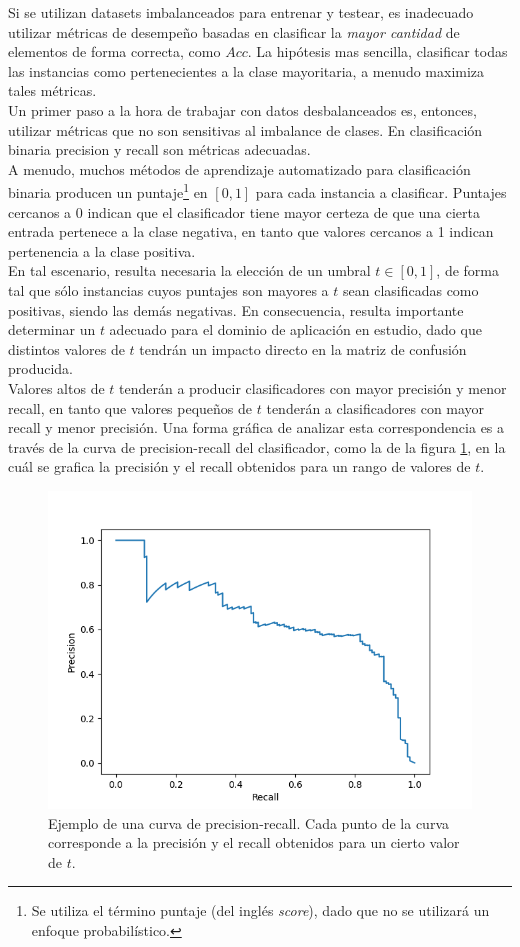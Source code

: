 Si se utilizan datasets imbalanceados para entrenar y testear, es inadecuado utilizar métricas de desempeño basadas en clasificar la \textit{mayor cantidad} de elementos de forma correcta, como $Acc$. La hipótesis mas sencilla, clasificar todas las instancias como pertenecientes a la clase mayoritaria, a menudo maximiza tales métricas. \\

Un primer paso a la hora de trabajar con datos desbalanceados es, entonces, utilizar métricas que no son sensitivas al imbalance de clases. En clasificación binaria precision y recall son métricas adecuadas. \\

A menudo, muchos métodos de aprendizaje automatizado para clasificación binaria producen un puntaje\footnote{Se utiliza el término puntaje (del inglés \textit{score}), dado que no se utilizará un enfoque probabilístico.} en $[0,1]$ para cada instancia a clasificar. Puntajes cercanos a 0 indican que el clasificador tiene mayor certeza de que una cierta entrada pertenece a la clase negativa, en tanto que valores cercanos a 1 indican pertenencia a la clase positiva. \\

En tal escenario, resulta necesaria la elección de un umbral $t \in [0,1]$, de forma tal que sólo instancias cuyos puntajes son mayores a $t$ sean clasificadas como positivas, siendo las demás negativas. En consecuencia, resulta importante determinar un $t$ adecuado para el dominio de aplicación en estudio, dado que distintos valores de $t$ tendrán un impacto directo en la matriz de confusión producida. \\

Valores altos de $t$ tenderán a producir clasificadores con mayor precisión y menor recall, en tanto que valores pequeños de $t$ tenderán a clasificadores con mayor recall y menor precisión. Una forma gráfica de analizar esta correspondencia es a través de la curva de precision-recall del clasificador, como la de la figura \ref{fig:prc}, en la cuál se grafica la precisión y el recall obtenidos para un rango de valores de $t$. \\

\begin{figure}[h]
\begin{center}
\includegraphics[width=.6\textwidth]{Kap1/PRc.png}
\end{center}
\caption[short]{Ejemplo de una curva de precision-recall. Cada punto de la curva corresponde a la precisión y el recall obtenidos para un cierto valor de $t$. }
\label{fig:prc}
\end{figure}

